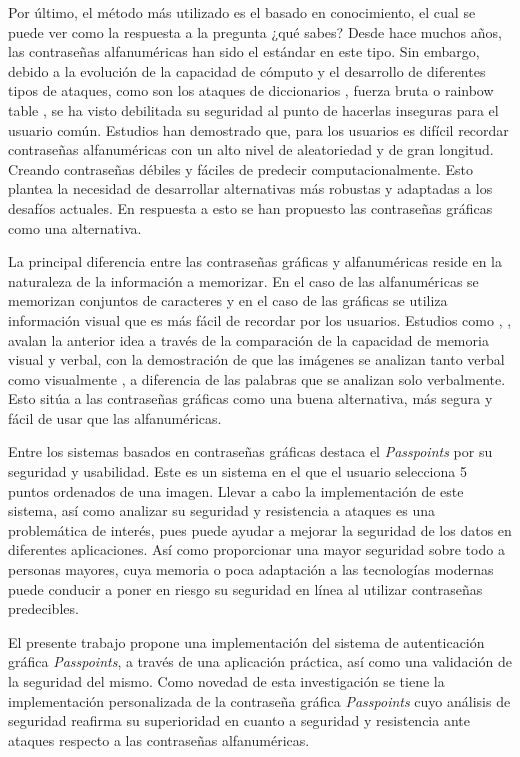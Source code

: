 Por último, el método más utilizado es el basado en conocimiento, el cual se puede ver como la respuesta a la pregunta ¿qué sabes? Desde hace muchos años, las contraseñas alfanuméricas han sido el estándar en este tipo. Sin embargo, debido a la evolución de la capacidad de cómputo y el desarrollo de diferentes tipos de ataques, como son los ataques de diccionarios \cite{10.1145/1102120.1102168}, fuerza bruta \cite{Apostol2012BruteforceA} o rainbow table \cite{wahab2024investigating}, se ha visto debilitada su seguridad al punto de hacerlas inseguras para el usuario común. Estudios han demostrado que, para los usuarios es difícil recordar contraseñas alfanuméricas con un alto nivel de aleatoriedad y de gran longitud. Creando contraseñas débiles y fáciles de predecir computacionalmente. Esto plantea la necesidad de desarrollar alternativas más robustas y adaptadas a los desafíos actuales. En respuesta a esto se han propuesto las contraseñas gráficas como una alternativa.

La principal diferencia entre las contraseñas gráficas y alfanuméricas reside en la naturaleza de la información a memorizar. En el caso de las alfanuméricas se memorizan conjuntos de caracteres y en el caso de las gráficas se utiliza información visual que es más fácil de recordar por los usuarios. Estudios como \cite{paivio2013imagery}, \cite{shepard1967recognition}, \cite{nelson1976pictorial} avalan la anterior idea a través de la comparación de la capacidad de memoria visual y verbal, con la demostración de que las imágenes se analizan tanto verbal como visualmente \cite{shepard1967recognition}, a diferencia de las palabras que se analizan solo verbalmente. Esto sitúa a las contraseñas gráficas como una buena alternativa, más segura y fácil de usar que las alfanuméricas.

Entre los sistemas basados en contraseñas gráficas destaca el \textit{Passpoints} \cite{wiedenbeck2005passpoints} por su seguridad y usabilidad. Este es un sistema en el que el usuario selecciona 5 puntos ordenados de una imagen. Llevar a cabo la implementación de este sistema, así como analizar su seguridad y resistencia a ataques es una problemática de interés, pues puede ayudar a mejorar la seguridad de los datos en diferentes aplicaciones. Así como proporcionar una mayor seguridad sobre todo a personas mayores, cuya memoria o poca adaptación a las tecnologías modernas puede conducir a poner en riesgo su seguridad en línea al utilizar contraseñas predecibles.

El presente trabajo propone una implementación del sistema de autenticación gráfica \textit{Passpoints}, a través de una aplicación práctica, así como una validación de la seguridad del mismo. Como novedad de esta investigación se tiene la implementación personalizada de la contraseña gráfica \textit{Passpoints} cuyo análisis de seguridad reafirma su superioridad en cuanto a seguridad y resistencia ante ataques respecto a las contraseñas alfanuméricas.



